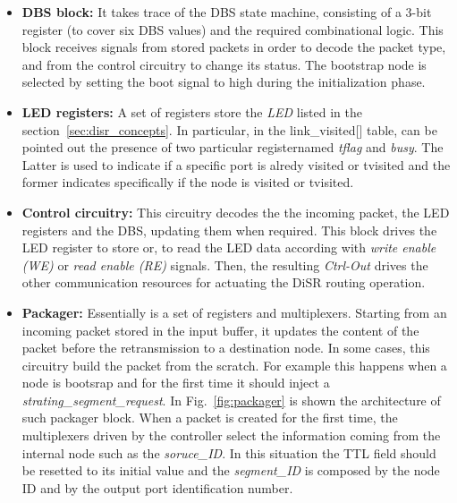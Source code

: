\begin{itemize}

	\item \textbf{DBS block:} 
	It takes trace of the DBS state machine, 
	consisting of a 3-bit register (to cover six DBS values) and the 
	required combinational logic. This block receives signals from 
	stored packets  in order to decode the packet type, and from 
	the control circuitry to change its status.
	The bootstrap node is selected by setting the boot signal to high
	during the initialization phase. 

	\item \textbf{LED registers:} 
	A set of registers store the \emph{LED} listed in the
	section~\ref{sec:disr_concepts}.  In particular, in the
	link\_visited[] table, can be pointed out the presence of two  
	particular registernamed \emph{tflag} and \emph{busy}.  The Latter
	is used to indicate if a specific port is alredy visited or tvisited and
	the former indicates specifically if the node is visited or tvisited.

    \item \textbf{Control circuitry:}
    This circuitry decodes the the      incoming packet, the LED
	registers and the DBS,     updating them when required. This block
	drives the LED register   to store or, to read the LED data
	according with     \emph{write enable (WE)} or \emph{read enable (RE)}
	signals. Then, the resulting \emph{Ctrl-Out} drives the other
	communication resources for actuating the DiSR routing operation.

	\item \textbf{Packager:}
	Essentially is a set of registers and multiplexers. Starting from
	an incoming packet stored in the input buffer, it updates the
	content of the packet before the retransmission to   a destination
	node.  In some cases, this circuitry build the packet from the
	scratch.  For example this happens when a node is bootsrap and for
	the first time it should inject a
	\emph{strating\_segment\_request}. In Fig.~\ref{fig:packager} is
	shown the architecture of such packager block. When a packet is
	created for the first time, the multiplexers driven by the
	controller select the information coming from the internal node
	such as the \emph{soruce\_ID}. In this situation the TTL field
	should be resetted to its initial value and the \emph{segment\_ID}
	is composed by the node ID and by the output port identification 
	number.

\end{itemize}

